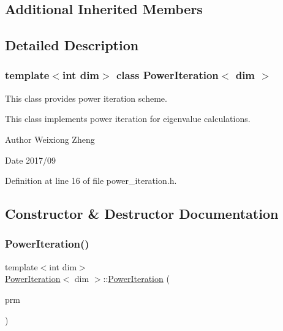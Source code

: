 \subsection*{Additional Inherited Members}


\subsection{Detailed Description}
\subsubsection*{template$<$int dim$>$\newline
class Power\+Iteration$<$ dim $>$}

This class provides power iteration scheme. 

This class implements power iteration for eigenvalue calculations.

\begin{DoxyAuthor}{Author}
Weixiong Zheng 
\end{DoxyAuthor}
\begin{DoxyDate}{Date}
2017/09 
\end{DoxyDate}


Definition at line 16 of file power\+\_\+iteration.\+h.



\subsection{Constructor \& Destructor Documentation}
\mbox{\label{class_power_iteration_a2608445223ce7d27b24be0f9d7042554}} 
\subsubsection{\texorpdfstring{Power\+Iteration()}{PowerIteration()}}
{\footnotesize\ttfamily template$<$int dim$>$ \\
\hyperlink{class_power_iteration}{Power\+Iteration}$<$ dim $>$\+::\hyperlink{class_power_iteration}{Power\+Iteration} (\begin{DoxyParamCaption}\item[{const Parameter\+Handler \&}]{prm }\end{DoxyParamCaption})}



